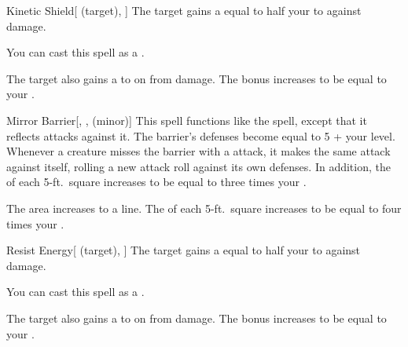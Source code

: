 \lowercase{\hypertarget{spell:Kinetic Shield}{}}\label{spell:Kinetic Shield}
\begin{attuneability}[Rank 4]{\hypertarget{spell:Kinetic Shield}{Kinetic Shield}}[ (target), ]
The target gains a  equal to half your  to  against  damage.

You can cast this spell as a .

\rankline
{} The target also gains a   to  on  from  damage.
 The bonus increases to be equal to your .
\end{attuneability}
\vspace{0.25em}



\lowercase{\hypertarget{spell:Mirror Barrier}{}}\label{spell:Mirror Barrier}
\begin{freeability}[Rank 4]{\hypertarget{spell:Mirror Barrier}{Mirror Barrier}}[, ,  (minor)]
\targetrule
This spell functions like the  spell, except that it reflects  attacks against it.
The barrier's defenses become equal to 5 + your level.
Whenever a creature misses the barrier with a  attack, it makes the same attack against itself, rolling a new attack roll against its own defenses.
In addition, the  of each 5-ft.\ square increases to be equal to three times your .

 The area increases to a \arealarge line.
 The  of each 5-ft.\ square increases to be equal to four times your .
\end{freeability}
\vspace{0.25em}



\lowercase{\hypertarget{spell:Resist Energy}{}}\label{spell:Resist Energy}
\begin{attuneability}[Rank 4]{\hypertarget{spell:Resist Energy}{Resist Energy}}[ (target), ]
The target gains a  equal to half your  to  against  damage.

You can cast this spell as a .

\rankline
{} The target also gains a   to  on  from  damage.
 The bonus increases to be equal to your .
\end{attuneability}
\vspace{0.25em}



